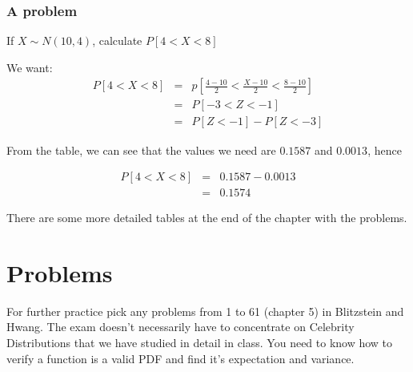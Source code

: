 \documentclass[12pt]{extbook}
\begin{document}
\newpage
\subsubsection{A problem}

If $X \sim N(10,4)$, calculate $P[4 < X < 8]$

We want:
\begin{eqnarray*}
P[4 < X < 8] &=& p \left[ \frac{4-10}{2} < \frac{X-10}{2} < \frac{8-10}{2} \right]\\
&=& P[-3 < Z < -1]\\
&=& P[Z < -1] - P[Z < -3]
\end{eqnarray*}

From the table, we can see that the values we need are $0.1587$ and $0.0013$, hence

\begin{eqnarray*}
P[4 < X < 8] &=& 0.1587-0.0013\\
 &=& 0.1574
\end{eqnarray*}

There are some more detailed tables at the end of the chapter with the problems.

\section{Problems}

\begin{enumerate}

















\end{enumerate}

For further practice pick any problems from 1 to 61 (chapter 5) in Blitzstein and Hwang.   The exam doesn't necessarily have to concentrate on Celebrity Distributions that we have studied in detail in class.   You need to know how to verify a function is a valid PDF and find it's expectation and variance.
\end{document}
